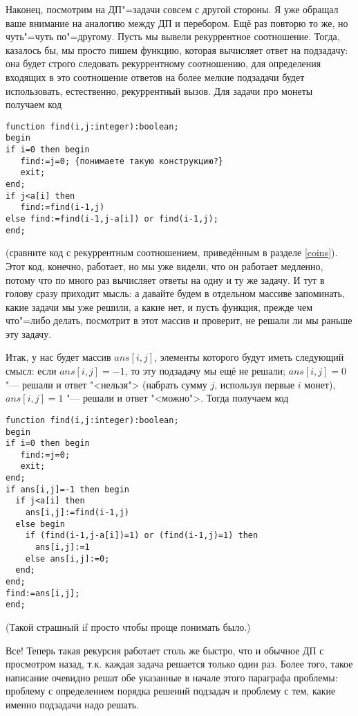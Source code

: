 Наконец, посмотрим на ДП"=задачи совсем с другой стороны. Я уже обращал ваше внимание на аналогию между ДП и перебором. Ещё раз повторю то же, но чуть"=чуть по"=другому. Пусть мы вывели рекуррентное соотношение. Тогда, казалось бы, мы просто пишем функцию, которая вычисляет ответ на подзадачу: она будет строго следовать рекуррентному соотношению, для определения входящих в это соотношение ответов на более мелкие подзадачи будет использовать, естественно, рекуррентный вызов. Для задачи про монеты получаем код
\begin{codesampleo}\begin{verbatim}
function find(i,j:integer):boolean;
begin
if i=0 then begin
   find:=j=0; {понимаете такую конструкцию?}
   exit;
end;
if j<a[i] then
   find:=find(i-1,j)
else find:=find(i-1,j-a[i]) or find(i-1,j);
end;
\end{verbatim}
\end{codesampleo}
(сравните код с рекуррентным соотношением, приведённым в разделе \ref{coins}). Этот код, конечно, работает, но мы уже видели, что он работает медленно, потому что по много раз вычисляет ответы на одну и ту же задачу. И тут в голову сразу приходит мысль: а давайте будем в отдельном массиве запоминать, какие задачи мы уже решили, а какие нет, и пусть функция, прежде чем что"=либо делать, посмотрит в этот массив и проверит, не решали ли мы раньше эту задачу.

Итак, у нас будет массив $ans[i,j]$, элементы которого будут иметь следующий смысл: если $ans[i,j]=-1$, то эту подзадачу мы ещё не решали; $ans[i,j]=0$ "--- решали и ответ "<нельзя"> (набрать сумму $j$, используя первые $i$ монет), $ans[i,j]=1$ "--- решали и ответ "<можно">. Тогда получаем код

\begin{codesampleo}\begin{verbatim}
function find(i,j:integer):boolean;
begin
if i=0 then begin
   find:=j=0;
   exit;
end;
if ans[i,j]=-1 then begin
  if j<a[i] then
    ans[i,j]:=find(i-1,j)
  else begin
    if (find(i-1,j-a[i])=1) or (find(i-1,j)=1) then
      ans[i,j]:=1
    else ans[i,j]:=0;
  end;
end;
find:=ans[i,j];
end;
\end{verbatim}
\end{codesampleo}
(Такой страшный if просто чтобы проще понимать было.)

Все! Теперь такая рекурсия работает столь же быстро, что и обычное ДП с просмотром назад, т.к. каждая задача решается только один раз. Более того, такое написание очевидно решат обе указанные в начале этого параграфа проблемы: проблему с определением порядка решений подзадач и проблему с тем, какие именно подзадачи надо решать.

